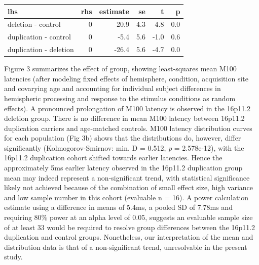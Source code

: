 \documentclass{article}
\begin{document}
\bigskip

\begin{center}
\begin{tabular}{l|r|r|r|r|r}
\hline
lhs & rhs & estimate & se & t & p\\
\hline
deletion - control & 0 & 20.9 & 4.3 & 4.8 & 0.0\\
\hline
duplication - control & 0 & -5.4 & 5.6 & -1.0 & 0.6\\
\hline
duplication - deletion & 0 & -26.4 & 5.6 & -4.7 & 0.0\\
\hline
\end{tabular}\end{center}

\bigskip

Figure 3 summarizes the effect of group, showing least-squares mean M100 latencies (after modeling fixed effects of hemisphere, condition, acquisition site and covarying age and accounting for individual subject differences in hemispheric processing and response to the stimulus conditions as random effects). A pronounced prolongation of M100 latency is observed in the 16p11.2 deletion group. There is no difference in mean M100 latency between 16p11.2 duplication carriers and age-matched controls. M100 latency distribution curves for each population (Fig 3b) shows that the distributions do, however, differ significantly (Kolmogorov-Smirnov: min. D = 0.512, \emph{p} = 2.578e-12), with the 16p11.2 duplication cohort shifted towards earlier latencies. Hence the approximately 5ms earlier latency observed in the 16p11.2 duplication group mean may indeed represent a non-significant trend, with statistical significance likely not achieved because of the combination of small effect size, high variance and low sample number in this cohort (evaluable n = 16). A power calculation estimate using a difference in means of 5.4ms, a pooled SD of 7.78ms and requiring 80\% power at an alpha level of 0.05, suggests an evaluable sample size of at least 33 would be required to resolve group differences between the 16p11.2 duplication and control groups. Nonetheless, our interpretation of the mean and distribution data is that of a non-significant trend, unresolvable in the present study.

\bigskip
\end{document}

